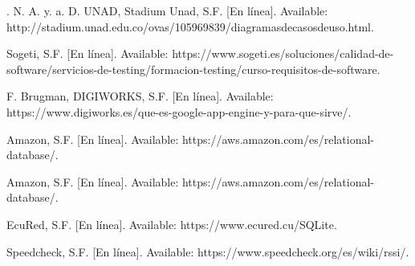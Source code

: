 \documentclass[conference,compsoc,onecolumn]{IEEEtran}
\begin{document}
\begin{thebibliography}{0}
    . N. A. y. a. D. UNAD, Stadium Unad, S.F. [En línea]. Available: http://stadium.unad.edu.co/ovas/105969839/diagramasdecasosdeuso.html.\newline

    Sogeti, S.F. [En línea]. Available: https://www.sogeti.es/soluciones/calidad-de-software/servicios-de-testing/formacion-testing/curso-requisitos-de-software.\newline

    F. Brugman, DIGIWORKS, S.F. [En línea]. Available: https://www.digiworks.es/que-es-google-app-engine-y-para-que-sirve/.\newline
    
    Amazon, S.F. [En línea]. Available: https://aws.amazon.com/es/relational-database/.\newline
    
    Amazon,  S.F. [En línea]. Available: https://aws.amazon.com/es/relational-database/.\newline
    
    EcuRed, S.F. [En línea]. Available: https://www.ecured.cu/SQLite.\newline
    
    Speedcheck, S.F. [En línea]. Available: https://www.speedcheck.org/es/wiki/rssi/.

\enskip

\end{thebibliography}
\end{document}
